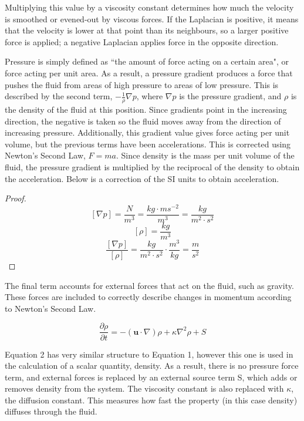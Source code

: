\documentclass[a4paper, 12pt]{article}
\begin{document}
    Multiplying this value by a viscosity constant determines how much the velocity is smoothed or evened-out by viscous forces. If the Laplacian is positive, it means that the velocity is lower at that point than its neighbours, so a larger positive force is applied; a negative Laplacian applies force in the opposite direction.

    Pressure is simply defined as ``the amount of force acting on a certain area"\cite{bbcbitesize}, or force acting per unit area. As a result, a pressure gradient produces a force that pushes the fluid from areas of high pressure to areas of low pressure. This is described by the second term, $-\frac{1}{\rho}\nabla{p}$, where $\nabla{p}$ is the pressure gradient, and $\rho$ is the density of the fluid at this position. Since gradients point in the increasing direction, the negative is taken so the fluid moves away from the direction of increasing pressure. Additionally, this gradient value gives force acting per unit volume, but the previous terms have been accelerations. This is corrected using Newton's Second Law, $F = ma$. Since density is the mass per unit volume of the fluid, the pressure gradient is multiplied by the reciprocal of the density to obtain the acceleration. Below is a correction of the SI units to obtain acceleration.

    \begin{proof}
        $$\left[\nabla{p}\right] = \frac{N}{m^3} = \frac{kg \cdot ms^{-2}}{m^3} = \frac{kg}{m^2\cdot s^2}$$
        $$\left[\rho\right] = \frac{kg}{m^3}$$
        $$\frac{\left[\nabla{p}\right]}{\left[\rho\right]} = \frac{kg}{m^2 \cdot s^2} \cdot \frac{m^3}{kg} = \frac{m}{s^2}$$
    \end{proof}
    
    The final term accounts for external forces that act on the fluid, such as gravity. These forces are included to correctly describe changes in momentum according to Newton's Second Law.

    \begin{equation}
        \frac{\partial{\rho}}{\partial{t}} = -(\textbf{u}\cdot\nabla)\rho + \kappa\nabla^2 \rho + S
    \end{equation}

    Equation 2 has very similar structure to Equation 1, however this one is used in the calculation of a scalar quantity, density. As a result, there is no pressure force term, and external forces is replaced by an external source term S, which adds or removes density from the system. The viscosity constant is also replaced with $\kappa$, the diffusion constant. This measures how fast the property (in this case density) diffuses through the fluid.
\end{document}
